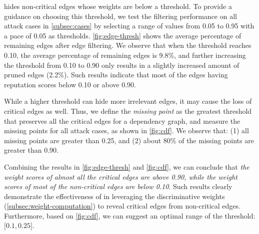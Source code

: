\tool hides non-critical edges whose weights are below a threshold.
To provide a guidance on choosing this threshold, we test the filtering performance on all attack cases
in \cref{subsec:cases}
by selecting a range of values from 0.05 to 0.95 with a pace of 0.05 as 
thresholds. 
\cref{fig:edge-thresh} shows the average percentage of remaining edges after edge filtering. We observe that when the threshold reaches 0.10, the average percentage of remaining edges is 9.8\%, and further increasing the threshold from 0.10 to 0.90 only results in a slightly increased amount of pruned edges (2.2\%). Such results indicate that most of the edges having reputation scores below 0.10 or above 0.90. 

While a higher threshold can hide more irrelevant edges, it may cause the loss of critical edges as well.
Thus, we define the \emph{missing point} as the greatest threshold that preserves all the critical edges for a dependency graph, 
and measure the missing points for all attack cases, as shown in \cref{fig:cdf}.
We observe that:
(1) all missing points are greater than 0.25,
and (2) about 80\% of the missing points are greater than 0.90.

Combining the results in \cref{fig:edge-thresh} and \cref{fig:cdf},
we can conclude that \emph{the weight scores of almost all the critical edges are above 0.90, while the weight scores of most of the non-critical edges are below 0.10}.
Such results clearly demonstrate the effectiveness of \tool in leveraging the discriminative weights (\cref{subsec:weight-computation}) to reveal critical edges from non-critical edges.
Furthermore, based on \cref{fig:cdf}, we can suggest an optimal range of the threshold: $\lbrack 0.1,0.25 \rbrack$.
  


\eat{
}

